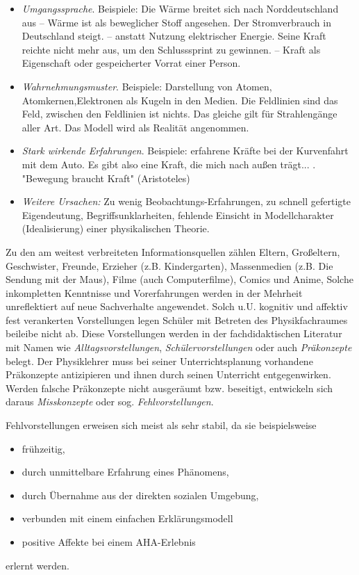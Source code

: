 \begin{itemize}
\item
\emph{Umgangssprache}. Beispiele: {\glqq}Die W{\"a}rme breitet sich nach Norddeutschland aus{\grqq} --  W{\"a}rme ist als beweglicher Stoff angesehen. {\glqq}Der Stromverbrauch in Deutschland steigt.{\grqq} --  anstatt Nutzung elektrischer Energie. {\glqq}Seine Kraft reichte nicht mehr aus, um den Schlusssprint zu gewinnen.{\grqq} -- Kraft als Eigenschaft oder gespeicherter Vorrat einer Person. 
\item
\emph{Wahrnehmungsmuster}. Beispiele: Darstellung von Atomen, Atomkernen,Elektronen als Kugeln in den Medien. Die Feldlinien sind das Feld, zwischen den Feldlinien ist nichts. Das gleiche gilt f{\"u}r Strahleng{\"a}nge aller Art. Das Modell wird  als Realit{\"a}t angenommen.
\item
\emph{Stark wirkende Erfahrungen}. Beispiele: erfahrene Kr{\"a}fte bei der Kurvenfahrt mit dem Auto. Es gibt also eine Kraft, die mich nach au{\ss}en tr{\"a}gt... . "Bewegung braucht Kraft" (Aristoteles)
\item
\emph{Weitere Ursachen:} Zu wenig Beobachtungs-Erfahrungen, zu schnell gefertigte Eigendeutung, Begriffsunklarheiten, fehlende Einsicht in Modellcharakter (Idealisierung) einer physikalischen Theorie. 
\end{itemize}

Zu den am weitest verbreiteten Informationsquellen z{\"a}hlen Eltern, Gro{\ss}eltern, Geschwister, Freunde, Erzieher (z.B. Kindergarten), Massenmedien (z.B. Die Sendung mit der Maus), Filme (auch Computerfilme), Comics und Anime,  Solche inkompletten Kenntnisse und Vorerfahrungen werden in der Mehrheit unreflektiert auf neue Sachverhalte angewendet.
\mip
Solch u.U. kognitiv und affektiv fest verankerten Vorstellungen legen Sch{\"u}ler mit Betreten des Physikfachraumes beileibe nicht ab. Diese Vorstellungen werden in der fachdidaktischen Literatur mit Namen wie \emph{Alltagsvorstellungen}, \emph{Sch{\"u}lervorstellungen} oder auch \emph{Pr{\"a}konzepte} belegt. Der Physiklehrer muss bei seiner Unterrichtsplanung  vorhandene Pr{\"a}konzepte antizipieren und ihnen durch seinen Unterricht entgegenwirken. Werden falsche Pr{\"a}konzepte nicht ausger{\"a}umt bzw. beseitigt, entwickeln sich daraus \emph{Misskonzepte} oder sog. \emph{Fehlvorstellungen}.

Fehlvorstellungen erweisen sich meist als sehr stabil, da sie beispielsweise
\begin{itemize}
\item fr\"{u}hzeitig,
\item durch unmittelbare Erfahrung eines Ph\"{a}nomens,
\item durch \"{U}bernahme aus der direkten sozialen Umgebung,
\item verbunden mit einem einfachen Erkl\"{a}rungsmodell
\item positive Affekte bei einem AHA-Erlebnis
\end{itemize}
erlernt werden.

